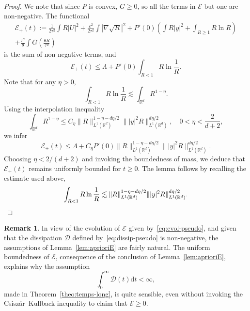 \documentclass[11pt]{article}
\theoremstyle{definition}
\newtheorem{rema}[theo]{Remark}
\numberwithin{equation}{section}
\numberwithin{figure}{section}
\numberwithin{table}{section}
\newcommand*\R{\mathbb{R}}
\newcommand*\dd {\mathrm{d}}
\newcommand*\<{\left\langle}
\renewcommand*\>{\right\rangle}
\renewcommand*\le{\leqslant}
\renewcommand*\ge{\geqslant}
\newcommand*\eps{\varepsilon}
\begin{document}
\begin{proof}
We note that since $P$ is convex, $G\ge0 $, so all the terms in $\mathcal E$ but one are non-negative. The functional
\begin{multline*}
\mathcal E_+(t) := \frac{1}{2\tau^2}\int R|U|^2+\frac{\eps^2}{2\tau^2} \int|\nabla \sqrt R|^2 +P'(0)\left(\int R|y|^2 + \int_{R\ge 1} R \ln R\right) \\
+ \frac{\tau^d}{\theta}\int G\left(\frac{\theta R}{\tau^d}\right)
\end{multline*}
is the sum of non-negative terms, and
\begin{equation*}
\mathcal E_+(t)\le \Lambda+ P'(0)\int_{R< 1} R \ln \frac{1}{R}.
\end{equation*}
Note that for any $\eta>0$,
\begin{equation*}
\int_{R< 1} R \ln \frac{1}{R} \lesssim \int_{\R^d} R^{1-\eta}.
\end{equation*}
Using the interpolation inequality
\begin{equation*}
\int_{\R^d} R^{1-\eta} \le C_{\eta}
\|R\|_{L^1(\R^d)}^{1-\eta-d\eta/2}\||y|^2 R\|_{L^1(\R^d)}^{d\eta/2},\quad 0<\eta<\frac{2}{d+2},
\end{equation*}
we infer
\begin{equation*}
\mathcal E_+(t)\le \Lambda+ C_\eta P'(0)\|R\|_{L^1(\R^d)}^{1-\eta-d\eta/2}\||y|^2 R\|_{L^1(\R^d)}^{d\eta/2}.
\end{equation*}
Choosing $\eta<2/(d+2)$ and invoking the boundedness of mass, we deduce that $ \mathcal E_+(t)$ remains uniformly bounded for $t \ge 0$. The lemma follows by recalling the estimate used above,
\begin{equation*}
\int_{R< 1} R \ln \frac{1}{R} \lesssim
\|R\|_{L^1(\R^d)}^{1-\eta-d\eta/2}\||y|^2 R\|_{L^1(\R^d)}^{d\eta/2}.\qedhere
\end{equation*}
\end{proof}

\begin{rema}
In view of the evolution of $\mathcal E$ given by~\eqref{eq:evol-pseudo}, and given that the dissipation $\mathcal D$ defined by~\eqref{eq:dissip-pseudo} is non-negative, the assumptions of Lemma~\ref{lem:aprioriE} are fairly natural. The uniform boundedness of $\mathcal E$, consequence of the conclusion of Lemma~\ref{lem:aprioriE}, explains why the assumption
\[
\int_0^\infty \mathcal D(t)\dd t<\infty,
\]
made in Theorem~\ref{theo:temps-long}, is quite sensible, even without invoking the Csisz\'ar--Kullback inequality to claim that $\mathcal E\ge 0$.
\end{rema}
\end{document}
